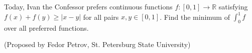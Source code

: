 Today, Ivan the Confessor prefers continuous functions $f:[0,1]\to\mathbb{R}$ satisfying $f(x)+f(y)\geq |x-y|$ for all pairs $x,y\in [0,1]$. Find the minimum of $\int_0^1 f$ over all preferred functions.

(Proposed by Fedor Petrov, St. Petersburg State University)